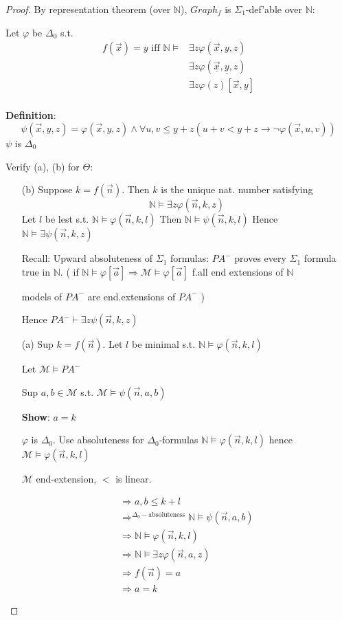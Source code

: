 \documentclass[12pt]{article}
\newcommand{\Nat}{\ensuremath{\mathbb{N}}}
\newcommand{\proves}{\vdash}
\newcommand{\defn}{\textbf{Definition}: }
\begin{document}
\begin{proof}
 By representation theorem (over $\Nat$), $Graph_f$ is
$\Sigma_1$-def'able over $\Nat$:

Let $\varphi$ be $\Delta_0$ s.t.
\begin{align*}
  f(\vec{x}) = y \text{ iff } \Nat \models &\exists z \varphi(\vec{x},y,z) \\
  &\exists z \varphi( \underline{\vec{x}} , \underline{y} ,z) \\
  &\exists z \varphi(z) [\vec{x}, y] \\
\end{align*}

\defn \[
\psi(\vec{x}, y, z) = \varphi(\vec{x}, y, z) \wedge \forall u, v \le y+z
( u+v < y + z \rightarrow \neg\varphi(\vec{x}, u, v) )
\]
$\psi$ is $\Delta_0$

Verify (a), (b) for $\Theta$:

\begin{enumerate}
  \item[(b)]
    Suppose $k=f(\vec{n})$. Then $k$ is the unique nat. number satisfying
    \[ \Nat \models \exists z \varphi(\vec{n}, k, z) 
    \]
    Let $l$ be lest s.t. $\Nat \models \varphi(\vec{n}, k, l)$
    Then $\Nat \models \psi(\vec{n},k,l)$
    Hence $\Nat \models \exists \psi(\vec{n},k,z)$

Recall: Upward absoluteness of $\Sigma_1$ formulas:
$PA^-$ proves every $\Sigma_1$ formula true in $\Nat$.
(
if $\Nat \models \varphi[\vec{a}] \Rightarrow 
\mathcal{M} \models \varphi[\vec{a}]$ f.all end extensions of $\Nat$

models of $PA^-$ are end.extensions of $PA^-$
)

Hence $PA^- \proves \exists z \psi(\vec{n},k,z)$

\item[(a)]
  Sup $k = f(\vec{n})$.
  Let $l$ be minimal s.t. 
  $\Nat \models \varphi(\vec{n},k,l)$

  Let $\mathcal{M} \models PA^-$

  Sup $a,b \in \mathcal{M}$ s.t. $\mathcal{M} \models \psi(\vec{n},a,b)$

  \textbf{Show}: $a = k$

  $\varphi$ is $\Delta_0$.  Use absoluteness for $\Delta_0$-formulas
  $\Nat \models \varphi(\vec{n},k,l)$ hence $\mathcal{M} \models \varphi(\vec{n},k,l)$

  $\mathcal{M}$ end-extension, $<$ is linear.
  
\begin{align*}
  \Rightarrow a,b \le k+l \\
  \Rightarrow^{\Delta_0-\text{absoluteness}} 
  \Nat \models \psi(\vec{n},a,b) \\
  \Rightarrow \Nat \models \varphi(\vec{n},k,l) \\
  \Rightarrow \Nat \models \exists z \varphi(\vec{n},a,z) \\
  \Rightarrow f(\vec{n}) = a \\
  \Rightarrow a = k
\end{align*}
\end{enumerate}
\end{proof}
\end{document}
